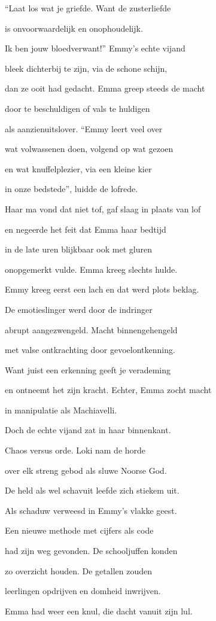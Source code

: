 “Laat los wat je griefde.
Want de zusterliefde

is onvoorwaardelijk
en onophoudelijk.

Ik ben jouw bloedverwant!”
Emmy’s echte vijand

bleek dichterbij te zijn,
via de schone schijn,

dan ze ooit had gedacht.
Emma greep steeds de macht

door te beschuldigen
of vals te huldigen

als aanzienuitslover.
“Emmy leert veel over

wat volwassenen doen,
volgend op wat gezoen

en wat knuffelplezier,
via een kleine kier

in onze bedstede”,
luidde de lofrede.

Haar ma vond dat niet tof,
gaf slaag in plaats van lof

en negeerde het feit
dat Emma haar bedtijd

in de late uren
blijkbaar ook met gluren

onopgemerkt vulde.
Emma kreeg slechts hulde.

Emmy kreeg eerst een lach
en dat werd plots beklag.

De emotieslinger
werd door de indringer

abrupt aangezwengeld.
Macht binnengehengeld

met valse ontkrachting
door gevoelontkenning.

Want juist een erkenning
geeft je verademing

en ontneemt het zijn kracht.
Echter, Emma zocht macht

in manipulatie
als Machiavelli.

Doch de echte vijand
zat in haar binnenkant.

Chaos versus orde.
Loki nam de horde

over elk streng gebod
als sluwe Noorse God.

De held als wel schavuit
leefde zich stiekem uit.

Als schaduw verweesd
in Emmy’s vlakke geest.

Een nieuwe methode
met cijfers als code

had zijn weg gevonden.
De schooljuffen konden

zo overzicht houden.
De getallen zouden

leerlingen opdrijven
en domheid inwrijven.

Emma had weer een knul,
die dacht vanuit zijn lul.

